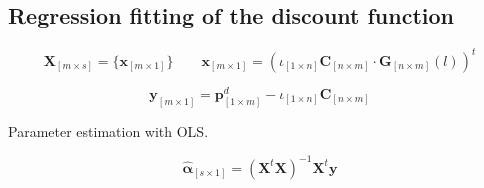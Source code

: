 \subsection{Regression fitting of the discount function}

	$$\bm{X}_{\left[m \times s\right]}=\{ \bm{x}_{\left[m \times 1\right]} \} \qquad  \bm{x}_{\left[m \times 1\right]} = \left( \iota_{\left[1\times n\right]} \bm{C}_{\left[n\times m\right]} \cdot \bm{G}_{\left[n\times m\right]}(l) \right)^t$$

	

	$$\bm{y}_{\left[m \times 1\right]}=  \bm{p}^d_{\left[1\times m\right]}  - \iota_{\left[1\times n\right]} \bm{C}_{\left[n\times m\right]}   $$


Parameter estimation with OLS.
	
\begin{equation}
\label{eq:paramspline}
\bm{\hat \alpha}_{\left[s \times 1\right]}= \left( \bm{X}^t   \bm{X}\right )^{-1}\bm{X}^t \bm{y}
\end{equation}



